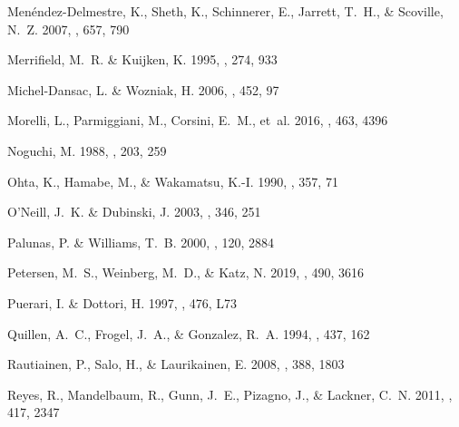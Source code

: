 \documentclass{aa}
\begin{document}
\begin{thebibliography}{100}
{Men{\'e}ndez-Delmestre}, K., {Sheth}, K., {Schinnerer}, E., {Jarrett}, T.~H.,
  \& {Scoville}, N.~Z. 2007, \apj, 657, 790

{Merrifield}, M.~R. \& {Kuijken}, K. 1995, \mnras, 274, 933

{Michel-Dansac}, L. \& {Wozniak}, H. 2006, \aap, 452, 97

{Morelli}, L., {Parmiggiani}, M., {Corsini}, E.~M., {et~al.} 2016, \mnras, 463,
  4396

{Noguchi}, M. 1988, \aap, 203, 259

{Ohta}, K., {Hamabe}, M., \& {Wakamatsu}, K.-I. 1990, \apj, 357, 71

{O'Neill}, J.~K. \& {Dubinski}, J. 2003, \mnras, 346, 251

{Palunas}, P. \& {Williams}, T.~B. 2000, \aj, 120, 2884

{Petersen}, M.~S., {Weinberg}, M.~D., \& {Katz}, N. 2019, \mnras, 490, 3616

{Puerari}, I. \& {Dottori}, H. 1997, \apjl, 476, L73

{Quillen}, A.~C., {Frogel}, J.~A., \& {Gonzalez}, R.~A. 1994, \apj, 437, 162

{Rautiainen}, P., {Salo}, H., \& {Laurikainen}, E. 2008, \mnras, 388, 1803

{Reyes}, R., {Mandelbaum}, R., {Gunn}, J.~E., {Pizagno}, J., \& {Lackner},
  C.~N. 2011, \mnras, 417, 2347


\end{thebibliography}
\end{document}
